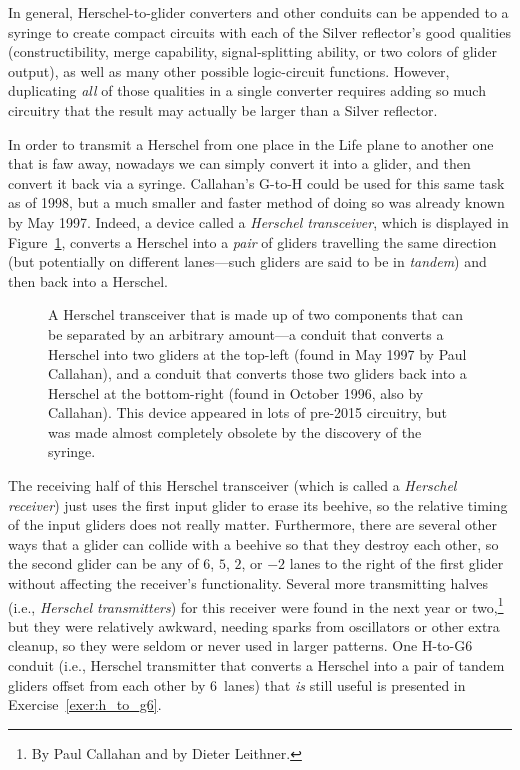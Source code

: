 In general, Herschel-to-glider converters and other conduits can be appended to a syringe to create compact circuits with each of the Silver reflector's good qualities (constructibility, merge capability, signal-splitting ability, or two colors of glider output), as well as many other possible logic-circuit functions. However, duplicating \emph{all} of those qualities in a single converter requires adding so much circuitry that the result may actually be larger than a Silver reflector.

In order to transmit a Herschel from one place in the Life plane to another one that is faw away, nowadays we can simply convert it into a glider, and then convert it back via a syringe. Callahan's G-to-H could be used for this same task as of 1998, but a much smaller and faster method of doing so was already known by May 1997. Indeed, a device called a \emph{Herschel transceiver}, which is displayed in Figure~\ref{fig:herschel_transceiver}, converts a Herschel into a \emph{pair} of gliders travelling the same direction (but potentially on different lanes---such gliders are said to be in \emph{tandem}) and then back into a Herschel.

\begin{figure}[!htb]
	\centering
	\caption{A Herschel transceiver that is made up of two components that can be separated by an arbitrary amount---a conduit that converts a Herschel into two gliders at the top-left (found in May 1997 by Paul Callahan), and a conduit that converts those two gliders back into a Herschel at the bottom-right (found in October 1996, also by Callahan). This device appeared in lots of pre-2015 circuitry, but was made almost completely obsolete by the discovery of the syringe.}
	\label{fig:herschel_transceiver}
\end{figure}

The receiving half of this Herschel transceiver (which is called a \emph{Herschel receiver}) just uses the first input glider to erase its beehive, so the relative timing of the input gliders does not really matter. Furthermore, there are several other ways that a glider can collide with a beehive so that they destroy each other, so the second glider can be any of $6$, $5$, $2$, or $-2$ lanes to the right of the first glider without affecting the receiver's functionality. Several more transmitting halves (i.e., \emph{Herschel transmitters}) for this receiver were found in the next year or two,\footnote{By Paul Callahan and by Dieter Leithner.} but they were relatively awkward, needing sparks from oscillators or other extra cleanup, so they were seldom or never used in larger patterns. One H-to-G6 conduit (i.e., Herschel transmitter that converts a Herschel into a pair of tandem gliders offset from each other by $6$~lanes) that \emph{is} still useful is presented in Exercise~\ref{exer:h_to_g6}.

